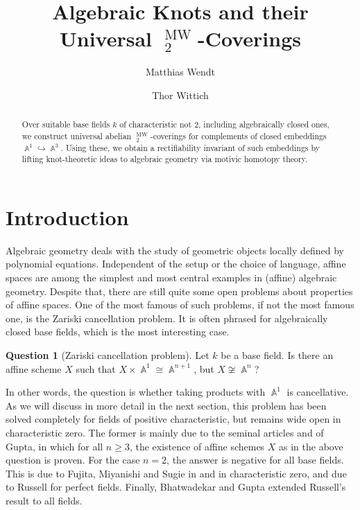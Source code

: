 \documentclass[english]{amsart}
\theoremstyle{definition}
\newtheorem*{quest*}{Question}
\DeclareMathOperator{\A}{\mathbb{A}}
\DeclareMathOperator{\KK}{\underline{K}}
\DeclareMathOperator{\MW}{MW}
\begin{document}
\title{Algebraic Knots and their Universal \texorpdfstring{$\KK^{\MW}_2$}{KMW2}-Coverings}

\author[Wendt]{Matthias Wendt}
\address[Wendt]{
Fachgruppe Mathematik/Informatik, Bergische Universit\"{a}t Wuppertal, 
Gaußstraße 20, 42119 Wuppertal,
Germany}

\author[Wittich]{Thor Wittich}
\address[Wittich]{
Department of Mathematics, Universit\"{a}t Osnabr\"{u}ck, 
Albrechtstrasse 28a, 49076 Osnabr\"{u}ck,
Germany}


\begin{abstract}
Over suitable base fields $k$ of characteristic not $2$, including algebraically closed ones, we construct universal abelian $\KK^{\MW}_2$-coverings for complements of closed embeddings $\A^1 \hookrightarrow \A^3$. Using these, we obtain a rectifiability invariant of such embeddings by lifting knot-theoretic ideas to algebraic geometry via motivic homotopy theory.
\end{abstract}
\maketitle

{ \hypersetup{hidelinks} \tableofcontents }

\section{Introduction}
Algebraic geometry deals with the study of geometric objects locally defined by polynomial equations. Independent of the setup or the choice of language, affine spaces are among the simplest and most central examples in (affine) algebraic geometry. Despite that, there are still quite some open problems about properties of affine spaces. One of the most famous of such problems, if not the most famous one, is the Zariski cancellation problem. It is often phrased for algebraically closed base fields, which is the most interesting case.
\begin{quest*}[Zariski cancellation problem]\label{ZCPIntro}
Let $k$ be a base field. Is there an affine scheme $X$ such that $X \times \A^1 \cong \A^{n+1}$, but $X \not\cong \A^n$?
\end{quest*}
In other words, the question is whether taking products with $\A^1$ is cancellative. As we will discuss in more detail in the next section, this problem has been solved completely for fields of positive characteristic, but remains wide open in characteristic zero. The former is mainly due to the seminal articles \cite{MR3148104} and \cite{MR3250286} of Gupta, in which for all $n \geq 3$, the existence of affine schemes $X$ as in the above question is proven. For the case  $n = 2$, the answer is negative for all base fields. This is due to Fujita, Miyanishi and Sugie in \cite{MR531454} and \cite{MR564667} in characteristic zero, and due to Russell \cite{MR615851} for perfect fields. Finally, Bhatwadekar and Gupta \cite{MR3368259} extended Russell's result to all fields.
\end{document}
